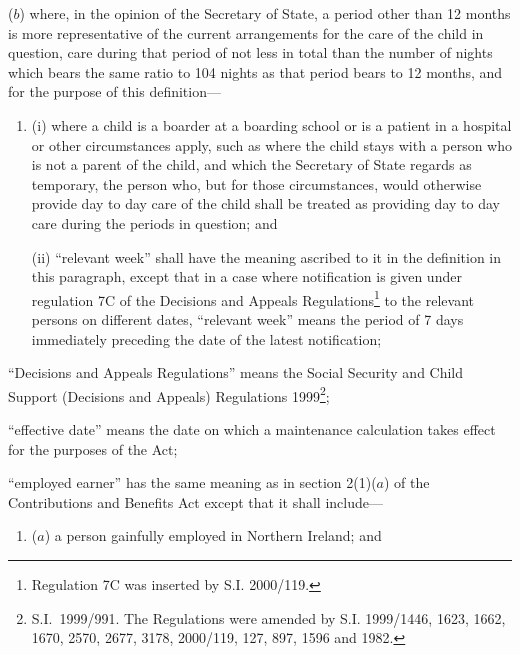 \documentclass[12pt,a4paper]{article}
\begin{document}
\begin{enumerate}
\begin{enumerate}
($b$) 
where, in the opinion of the Secretary of State, a period other than 12 months is more representative of the current arrangements for the care of the child in question, care during that period of not less in total than the number of nights which bears the same ratio to 104 nights as that period bears to 12 months, and for the purpose of this definition—
\begin{enumerate}\item[]
(i)
where a child is a boarder at a boarding school or is a patient in a hospital or other circumstances apply, such as where the child stays with a person who is not a parent of the child, and which the Secretary of State regards as temporary, the person who, but for those circumstances, would otherwise provide day to day care of the child shall be treated as providing day to day care during the periods in question; and

(ii)
“relevant week” shall have the meaning ascribed to it in the definition in this paragraph, except that in a case where notification is given under regulation 7C of the Decisions and Appeals Regulations\footnote{\frenchspacing Regulation 7C was inserted by S.I. 2000/119.} to the relevant persons on different dates, “relevant week” means the period of 7 days immediately preceding the date of the latest notification;
\end{enumerate}
\end{enumerate}

“Decisions and Appeals Regulations” means the Social Security and Child Support (Decisions and Appeals) Regulations 1999\footnote{S.I.\ 1999/991. The Regulations were amended by S.I. 1999/1446, 1623, 1662, 1670, 2570, 2677, 3178, 2000/119, 127, 897, 1596 and 1982.};


“effective date” means the date on which a maintenance calculation takes effect for the purposes of the Act;

“employed earner” has the same meaning as in section 2(1)($a$)  of the Contributions and Benefits Act except that it shall include—
\begin{enumerate}\item[]
($a$) 
a person gainfully employed in Northern Ireland; and


\end{enumerate}
\end{enumerate}
\end{document}
